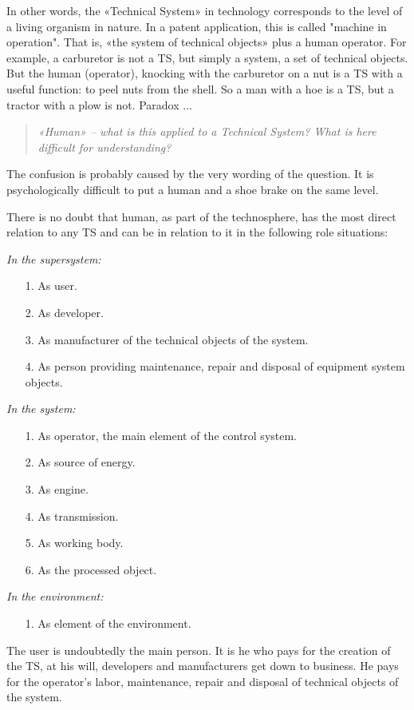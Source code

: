 \documentclass[11pt,a4paper]{article}
\begin{document}
In other words, the «Technical System» in technology corresponds to the level
of a living organism in nature. In a patent application, this is called
"machine in operation". That is, «the system of technical objects» plus a
human operator. For example, a carburetor is not a TS, but simply a system, a
set of technical objects. But the human (operator), knocking with the
carburetor on a nut is a TS with a useful function: to peel nuts from the
shell.  So a man with a hoe is a TS, but a tractor with a plow is not.
Paradox ...

\begin{quote}\it
  «Human» -- what is this applied to a Technical System?  What is here
  difficult for understanding?
\end{quote}
The confusion is probably caused by the very wording of the question.  It is
psychologically difficult to put a human and a shoe brake on the same level.

There is no doubt that human, as part of the technosphere, has the most direct
relation to any TS and can be in relation to it in the following role
situations:

\emph{In the supersystem:}
\begin{itemize}[noitemsep]
\item[1.] As user.
\item[2.] As developer.
\item[3.] As manufacturer of the technical objects of the system.
\item[4.] As person providing maintenance, repair and disposal of equipment
  system objects.
\end{itemize}
\emph{In the system:}
\begin{itemize}[noitemsep]
\item[1.] As operator, the main element of the control system.
\item[2.] As source of energy.
\item[3.] As engine.
\item[4.] As transmission.
\item[5.] As working body.
\item[6.] As the processed object.
\end{itemize}
\emph{In the environment:}
\begin{itemize}[noitemsep]
\item[1.] As element of the environment.
\end{itemize}
The user is undoubtedly the main person. It is he who pays for the creation of
the TS, at his will, developers and manufacturers get down to business. He
pays for the operator's labor, maintenance, repair and disposal of technical
objects of the system.
\end{document}
